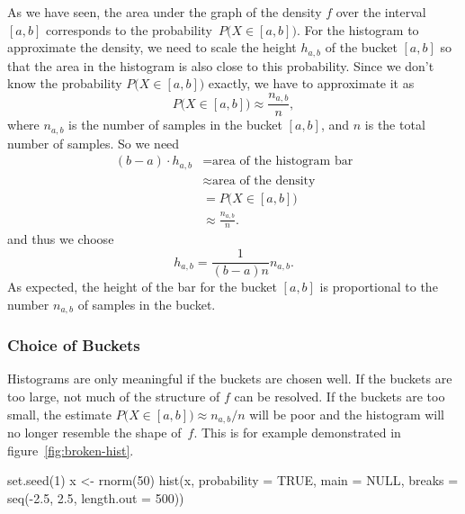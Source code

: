 \documentclass[
  a4paper,
]{article}
\newenvironment{Shaded}{\begin{snugshade}}{\end{snugshade}}
\newcommand{\AttributeTok}[1]{\textcolor[rgb]{0.77,0.63,0.00}{#1}}
\newcommand{\ConstantTok}[1]{\textcolor[rgb]{0.00,0.00,0.00}{#1}}
\newcommand{\DecValTok}[1]{\textcolor[rgb]{0.00,0.00,0.81}{#1}}
\newcommand{\FloatTok}[1]{\textcolor[rgb]{0.00,0.00,0.81}{#1}}
\newcommand{\FunctionTok}[1]{\textcolor[rgb]{0.00,0.00,0.00}{#1}}
\newcommand{\NormalTok}[1]{#1}
\newcommand{\OtherTok}[1]{\textcolor[rgb]{0.56,0.35,0.01}{#1}}
\newcommand{\SpecialCharTok}[1]{\textcolor[rgb]{0.00,0.00,0.00}{#1}}
\theoremstyle{definition}
\theoremstyle{definition}
\theoremstyle{definition}
\theoremstyle{definition}
\theoremstyle{remark}
\begin{document}
As we have seen, the area under the graph of the density \(f\) over the
interval \([a, b]\) corresponds to the probability~\(P\bigl(X \in [a,b]\bigr)\). For the histogram to approximate the density, we need
to scale the height \(h_{a,b}\) of the bucket \([a, b]\) so that the area
in the histogram is also close to this probability. Since we don't
know the probability \(P\bigl(X \in [a,b]\bigr)\) exactly, we have to
approximate it as
\begin{equation*}
  P\bigl(X \in [a,b]\bigr)
  \approx \frac{n_{a,b}}{n},
\end{equation*}
where \(n_{a,b}\) is the number of samples in the bucket \([a,b]\),
and \(n\) is the total number of samples. So we need
\begin{align*}
  (b-a) \cdot h_{a,b}
    &= \mbox{area of the histogram bar} \\
    &\approx \mbox{area of the density} \\
    &= P\bigl(X \in [a,b]\bigr) \\
    &\approx \frac{n_{a,b}}{n}.
\end{align*}
and thus we choose
\begin{equation*}
  h_{a,b}
  = \frac{1}{(b - a) n} n_{a,b}.
\end{equation*}
As expected, the height of the bar for the bucket \([a,b]\) is proportional
to the number \(n_{a,b}\) of samples in the bucket.

\hypertarget{choice-of-buckets}{%
\subsubsection{Choice of Buckets}\label{choice-of-buckets}}

Histograms are only meaningful if the buckets are chosen well. If
the buckets are too large, not much of the structure of \(f\) can be
resolved. If the buckets are too small, the estimate \(P\bigl(X \in [a,b]\bigr) \approx n_{a,b}/n\) will be poor and the histogram will
no longer resemble the shape of~\(f\). This is for example demonstrated
in figure~\ref{fig:broken-hist}.



\begin{Shaded}
\begin{Highlighting}[]
\FunctionTok{set.seed}\NormalTok{(}\DecValTok{1}\NormalTok{)}
\NormalTok{x }\OtherTok{\textless{}{-}} \FunctionTok{rnorm}\NormalTok{(}\DecValTok{50}\NormalTok{)}
\FunctionTok{hist}\NormalTok{(x, }\AttributeTok{probability =} \ConstantTok{TRUE}\NormalTok{, }\AttributeTok{main =} \ConstantTok{NULL}\NormalTok{,}
     \AttributeTok{breaks =} \FunctionTok{seq}\NormalTok{(}\SpecialCharTok{{-}}\FloatTok{2.5}\NormalTok{, }\FloatTok{2.5}\NormalTok{, }\AttributeTok{length.out =} \DecValTok{500}\NormalTok{))}
\end{Highlighting}
\end{Shaded}
\end{document}
